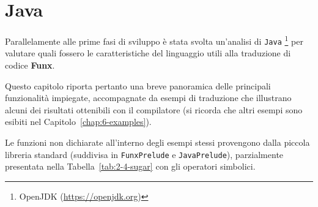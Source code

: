 \chapter{Java}
\label{chap:4-java}

Parallelamente alle prime fasi di sviluppo è stata svolta un'analisi di \texttt{Java}%
\footnote{OpenJDK (\url{https://openjdk.org})}
per valutare quali fossero le caratteristiche del linguaggio utili alla traduzione di codice \textbf{Funx}.

\noindent Questo capitolo riporta pertanto una breve panoramica delle principali funzionalità impiegate,
accompagnate da esempi di traduzione che illustrano alcuni dei risultati ottenibili con il compilatore
(si ricorda che altri esempi sono esibiti nel Capitolo~\ref{chap:6-examples}).

Le funzioni non dichiarate all'interno degli esempi stessi provengono dalla piccola libreria standard
(suddivisa in \texttt{FunxPrelude} e \texttt{JavaPrelude}),
parzialmente presentata nella Tabella~\ref{tab:2-4-sugar} con gli operatori simbolici.



\newpage



\newpage

